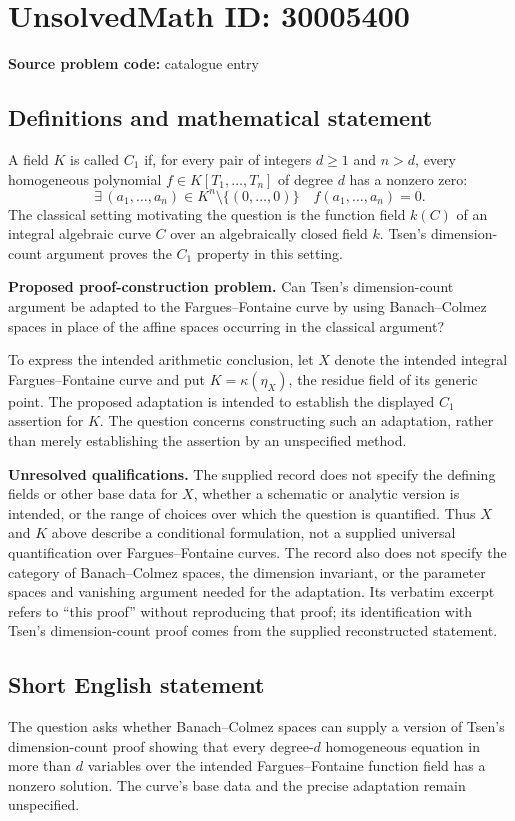 \documentclass[11pt]{article}
\begin{document}
\section*{UnsolvedMath ID: 30005400}
\textbf{Source problem code:} catalogue entry
\subsection{Definitions and mathematical statement}
A field \(K\) is called \(C_1\) if, for every pair of integers \(d\geq 1\) and \(n>d\), every homogeneous polynomial \(f\in K[T_1,\ldots,T_n]\) of degree \(d\) has a nonzero zero:
\[
\exists\,(a_1,\ldots,a_n)\in K^n\setminus\{(0,\ldots,0)\}
\quad f(a_1,\ldots,a_n)=0.
\]
The classical setting motivating the question is the function field \(k(C)\) of an integral algebraic curve \(C\) over an algebraically closed field \(k\). Tsen's dimension-count argument proves the \(C_1\) property in this setting.

\textbf{Proposed proof-construction problem.} Can Tsen's dimension-count argument be adapted to the Fargues--Fontaine curve by using Banach--Colmez spaces in place of the affine spaces occurring in the classical argument?

To express the intended arithmetic conclusion, let \(X\) denote the intended integral Fargues--Fontaine curve and put \(K=\kappa(\eta_X)\), the residue field of its generic point. The proposed adaptation is intended to establish the displayed \(C_1\) assertion for \(K\). The question concerns constructing such an adaptation, rather than merely establishing the assertion by an unspecified method.

\textbf{Unresolved qualifications.} The supplied record does not specify the defining fields or other base data for \(X\), whether a schematic or analytic version is intended, or the range of choices over which the question is quantified. Thus \(X\) and \(K\) above describe a conditional formulation, not a supplied universal quantification over Fargues--Fontaine curves. The record also does not specify the category of Banach--Colmez spaces, the dimension invariant, or the parameter spaces and vanishing argument needed for the adaptation. Its verbatim excerpt refers to ``this proof'' without reproducing that proof; its identification with Tsen's dimension-count proof comes from the supplied reconstructed statement.
\subsection{Short English statement}
The question asks whether Banach--Colmez spaces can supply a version of Tsen's dimension-count proof showing that every degree-\(d\) homogeneous equation in more than \(d\) variables over the intended Fargues--Fontaine function field has a nonzero solution. The curve's base data and the precise adaptation remain unspecified.
\end{document}

